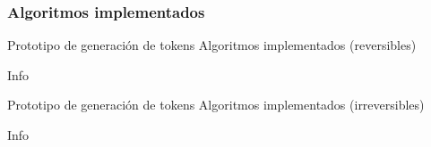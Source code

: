 %
%
%

\subsubsection{Algoritmos implementados}

\begin{frame}{Prototipo de generación de tokens}
{Algoritmos implementados (reversibles)}
  
  Info


\end{frame}

\begin{frame}{Prototipo de generación de tokens}
{Algoritmos implementados (irreversibles)}
  
  Info


\end{frame}
